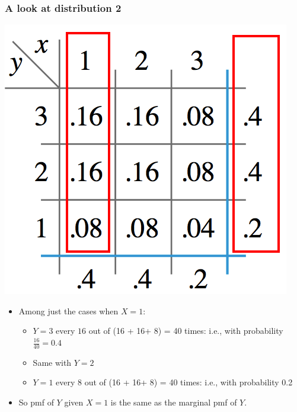 \documentclass[handout]{beamer}\usepackage[]{graphicx}\usepackage[]{color}
\numberwithin{equation}{section}
\begin{document}
\begin{frame}
\frametitle{A look at distribution 2}
\begin{center}
 \includegraphics{../../fig/d2.png}
\end{center}
\begin{itemize}
\pause \item Among just the cases when $X = 1$:
\begin{itemize}
\pause \item $Y = 3$ every $16$ out of (16 + 16+ 8) = 40 times: i.e., with probability $\frac{16}{40} = 0.4$ 
\pause \item Same with $Y = 2$
\pause \item $Y = 1$ every $8$ out of (16 + 16+ 8) = 40 times: i.e., with probability 0.2
\end{itemize}
\pause \item So pmf of $Y$ given $X = 1$ is the same as the marginal pmf of $Y$.
\end{itemize}
\end{frame}
\end{document}
